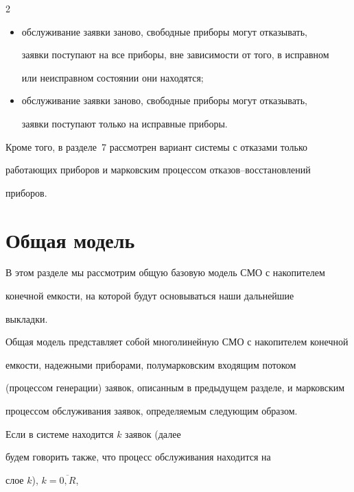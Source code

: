 \begin{multicols}{2}
\begin{itemize}
исправном состоянии;


\item обслуживание заявки заново, свободные приборы могут отказывать,


заявки поступают на все приборы, вне зависимости от того, в исправном


или неисправном состоянии они находятся;


\item  обслуживание заявки заново, свободные приборы могут отказывать,


заявки поступают только на исправные приборы.


\end{itemize}





Кроме того, в разделе~7 рассмотрен вариант сис\-те\-мы с отказами только


работающих приборов и марковским процессом отказов--восстановлений


приборов.





\section{Общая модель}





В этом разделе мы рассмотрим общую базовую модель СМО с накопителем


конечной емкости, на которой будут основываться наши дальнейшие


выкладки.





Общая модель представляет собой многолинейную СМО с накопителем конечной


емкости, надежными приборами, полумарковским входящим потоком


(процессом генерации) заявок, описанным в предыдущем разделе, и марковским


процессом обслуживания заявок, определяемым следующим образом.





Если в системе находится $k$  заявок (далее


будем говорить также, что процесс обслуживания находится на


слое $k$), $k=\overline{0,R}$,



\end{multicols}
